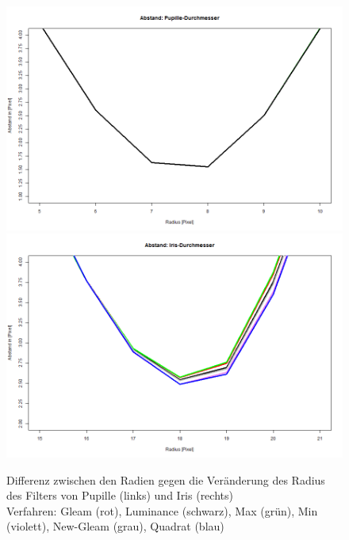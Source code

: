 \begin{figure}
	\centering
	\includegraphics[width=0.49\linewidth]{Eye_Img_Box/Vergleich_P}
	\includegraphics[width=0.49\linewidth]{Eye_Img_Box/Vergleich_I}
	\caption{Differenz zwischen den Radien gegen die Veränderung des Radius des Filters von Pupille (links) und Iris (rechts)\\
		Verfahren: Gleam (rot), Luminance (schwarz), Max (grün), Min (violett), New-Gleam (grau), Quadrat (blau)}
	\label{img_vergleich_PI}
\end{figure}
